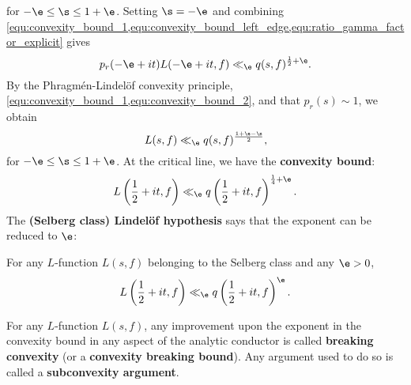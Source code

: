     for $-\e \le \s \le 1+\e$. Setting $\s = -\e$ and combining \cref{equ:convexity_bound_1,equ:convexity_bound_left_edge,equ:ratio_gamma_factor_explicit} gives
    \begin{equation}\label{equ:convexity_bound_2}
      p_{r}(-\e+it)L(-\e+it,f) \ll_{\e} q(s,f)^{\frac{1}{2}+\e}.
    \end{equation}
    By the Phragm\'en-Lindel\"of convexity principle, \cref{equ:convexity_bound_1,equ:convexity_bound_2}, and that $p_{r}(s) \sim 1$, we obtain
    \[
      L(s,f) \ll_{\e} q(s,f)^{\frac{1+\e-\s}{2}},
    \]
    for $-\e \le \s \le 1+\e$. At the critical line, we have the \textbf{convexity bound}:
    \begin{equation}\label{equ:convexity_bound_L_function}
      L\left(\frac{1}{2}+it,f\right) \ll_{\e} q\left(\frac{1}{2}+it,f\right)^{\frac{1}{4}+\e}.
    \end{equation}
    The \textbf{(Selberg class) Lindel\"of hypothesis} says that the exponent can be reduced to $\e$:

    \begin{conjecture}
      For any $L$-function $L(s,f)$ belonging to the Selberg class and any $\e > 0$,
      \[
        L\left(\frac{1}{2}+it,f\right) \ll_{\e} q\left(\frac{1}{2}+it,f\right)^{\e}.
      \]
    \end{conjecture}

    For any $L$-function $L(s,f)$, any improvement upon the exponent in the convexity bound in any aspect of the analytic conductor is called \textbf{breaking convexity} (or a \textbf{convexity breaking bound}). Any argument used to do so is called a \textbf{subconvexity argument}.